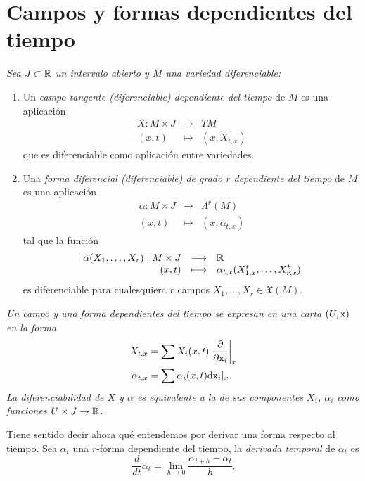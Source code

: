 \section{Campos y formas dependientes del tiempo} \label{sec:tiempo}

  \begin{defn} \leavevmode
    \em 
    Sea $ J\subset \mathbb{R} $ un intervalo abierto y $ M $ una variedad diferenciable:
    \begin{enumerate}
      \item Un \emph{campo tangente (diferenciable) dependiente del tiempo} de $M$ es una aplicación \[\begin{array}{rcl}X:M\times J & \longrightarrow & TM \\ (x,t) & \longmapsto & (x,X_{t,x}) \end{array} \] que es diferenciable como aplicación entre variedades. 
      \item Una \emph{forma diferencial (diferenciable) de grado $r$ dependiente del tiempo} de $M$ es una aplicación \[\begin{array}{rcl} \alpha: M \times J & \longrightarrow & \Lambda^r(M) \\ (x,t) &  \longmapsto & (x,\alpha_{t,x}) \end{array}\] tal que la función \[\begin{array}{rcl} \alpha(X_1,\dots,X_r):M\times J & \longrightarrow & \mathbb{R} \\ (x,t) & \longmapsto & \alpha_{t,x}(X_{1,x}^t,\dots,X_{r,x}^t)\end{array}\] es diferenciable para cualesquiera $r$ campos $X_1,\dots,X_r \in \mathfrak{X}(M)$.
    \end{enumerate}
  \end{defn}

  \begin{obs}
    \em
    Un campo y una forma dependientes del tiempo se expresan en una carta $(U,\mathtt{x})$ en la forma
    \begin{align*}
      X_{t,x} &= \sum X_i(x,t) \left.\frac{\partial}{\partial \mathtt{x}_i}\right|_x \\
      \alpha_{t,x} &= \sum \alpha_i(x,t) \mathrm{d} \mathtt{x}_i |_x.
    \end{align*}
    La diferenciabilidad de $X$ y $\alpha$ es equivalente a la de sus componentes $X_i$, $\alpha_i$ como funciones $U\times J \rightarrow \mathbb{R}$.
  \end{obs}
  Tiene sentido decir ahora qué entendemos por derivar una forma respecto al tiempo. Sea $\alpha_t$ una $r$-forma dependiente del tiempo, la \emph{derivada temporal} de $\alpha_t$ es
    \begin{equation*}
      \frac{d}{dt} \alpha_t = \lim_{h\rightarrow 0}\frac{\alpha_{t+h}-\alpha_t}{h}.
    \end{equation*}

